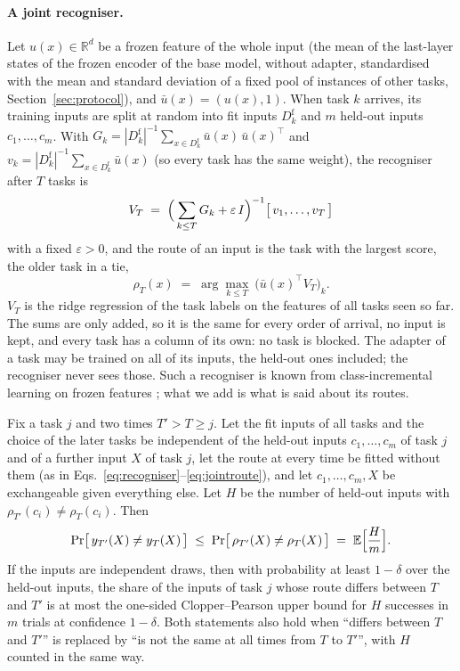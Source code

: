 \paragraph{A joint recogniser.} Let $u(x) \in \mathbb{R}^d$ be a frozen feature of the whole
input (the mean of the last-layer states of the frozen encoder of the base
model, without adapter, standardised with the mean and standard deviation of a fixed pool of
instances of other tasks, Section~\ref{sec:protocol}), and
$\bar u(x) = (u(x), 1)$. When task $k$ arrives, its
training inputs are split at random into fit inputs $D_k^{\mathrm{f}}$ and $m$ held-out inputs
$c_1, \dots, c_m$. With $G_k = |D_k^{\mathrm{f}}|^{-1} \sum_{x \in D_k^{\mathrm{f}}} \bar u(x)\, \bar u(x)^{\!\top}$ and $v_k = |D_k^{\mathrm{f}}|^{-1} \sum_{x \in D_k^{\mathrm{f}}} \bar u(x)$ (so every task has the same weight),
the recogniser after $T$ tasks is
\begin{equation}
  V_T \;=\; \Bigl(\, \sum_{k \le T} G_k + \varepsilon\, I \Bigr)^{-1} \bigl[\, v_1, \dots, v_T \,\bigr]
  \label{eq:recogniser}
\end{equation}
with a fixed $\varepsilon > 0$, and the route of an input is the task with the largest score, the older task in a tie,
\begin{equation}
  \rho_T(x) \;=\; \arg\max_{k \le T}\ \bigl(\bar u(x)^{\!\top} V_T\bigr)_k .
  \label{eq:jointroute}
\end{equation}
$V_T$ is the ridge regression of the task labels on the features of all tasks seen so far. The
sums are only added, so it is the same for every order of arrival, no input is kept, and every task
has a column of its own: no task is blocked. The adapter of a task may be trained on all of its
inputs, the held-out ones included; the recogniser never sees those. Such a recogniser is known
from class-incremental learning on frozen features \citep{mcdonnell2023ranpac,zhuang2022acil}; what
we add is what is said about its routes.

\begin{proposition}
\label{prop:audit}
Fix a task $j$ and two times $T' > T \ge j$. Let the fit inputs of all tasks and the choice of the
later tasks be independent of the held-out inputs $c_1, \dots, c_m$ of task $j$ and of a further
input $X$ of task $j$, let the route at every time be fitted without them (as in
Eqs.~\eqref{eq:recogniser}--\eqref{eq:jointroute}), and let $c_1, \dots, c_m, X$ be exchangeable
given everything else. Let $H$ be the number of held-out inputs with
$\rho_{T'}(c_i) \ne \rho_T(c_i)$. Then
\[
  \Pr\bigl[\, y_{T'}(X) \ne y_T(X) \,\bigr] \;\le\; \Pr\bigl[\, \rho_{T'}(X) \ne \rho_T(X) \,\bigr]
  \;=\; \mathbb{E}\Bigl[\frac{H}{m}\Bigr] .
\]
If the inputs are independent draws, then with probability at least $1 - \delta$ over the held-out
inputs, the share of the inputs of task $j$ whose route differs between $T$ and $T'$ is at most
the one-sided Clopper--Pearson upper bound for $H$ successes in $m$ trials at confidence
$1 - \delta$. Both statements also hold when ``differs between $T$ and $T'$'' is replaced by ``is
not the same at all times from $T$ to $T'$'', with $H$ counted in the same way.
\end{proposition}

